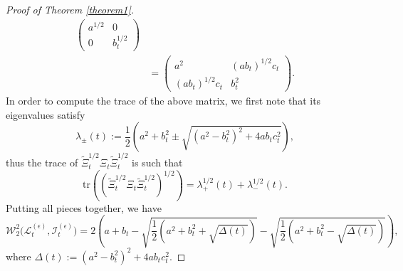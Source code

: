 \documentclass[12pt,thmsa]{article}
\begin{document}
\begin{proof}[Proof of Theorem \ref{theorem1}]
\begin{equation}
\begin{split}
\begin{pmatrix}
				a^{1/2} & 0\\
				0 & b^{1/2}_t
			\end{pmatrix}\\
			&=\begin{pmatrix}
				a^{2} & (ab_t)^{1/2}c_t\\
				(ab_t)^{1/2}c_t & b^{2}_t
			\end{pmatrix}.
		\end{split}
	\end{equation}
	In order to compute the trace of the above matrix, we first note that its eigenvalues   satisfy
	\[
	\lambda_{\pm}(t):=\frac{1}{2}\left(a^2+b_t^2\pm \sqrt{(a^2-b^2_t)^2+4ab_tc_t^2}\right),
	\]
	thus the  trace of $\widetilde{\Xi}_t^{1/2}\Xi_t\widetilde{\Xi}_t^{1/2}$ is such that 
	\[
	\mathrm{tr}\left(\left(\widetilde{\Xi}_t^{1/2}\Xi_t\widetilde{\Xi}_t^{1/2}\right)^{1/2}\right)=\lambda^{1/2}_+(t) +\lambda^{1/2}_{-}(t).
	\]
	Putting all pieces together, we have
	\[
	\mathcal{W}^2_2\Big(\mathcal{L}^{(\epsilon)}_{t},\mathcal{I}^{(\epsilon)}_{t}\Big)=2\left(a+b_t-\sqrt{\frac{1}{2}\left(a^2+b^2_t+ \sqrt{\Delta(t)}\right)}-\sqrt{\frac{1}{2}\left(a^2+b^2_t- \sqrt{\Delta(t)}\right)}\right),
	\]
	where $\Delta(t):=(a^2-b^2_t)^2+4ab_tc^2_t$. 
	

\end{proof}
\end{document}
